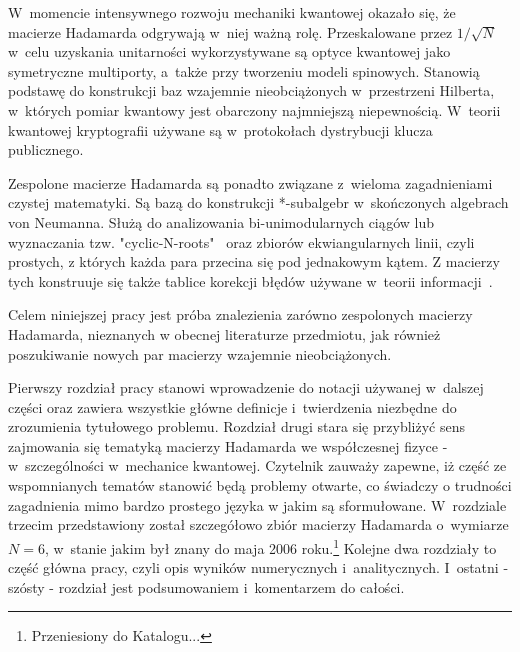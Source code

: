 \documentclass[a4paper,12pt,twoside]{article}
\begin{document}
W~momencie intensywnego rozwoju mechaniki kwantowej okaza{\l}o si\k{e}, \.{z}e macierze Hadamarda odgrywaj\k{a} w~niej wa\.{z}n\k{a} rol\k{e}. Przeskalowane przez $1/\sqrt{N}$ w~celu uzyskania unitarno\'{s}ci wykorzystywane s\k{a} optyce kwantowej jako symetryczne multiporty, a~tak\.{z}e przy tworzeniu modeli spinowych. Stanowi\k{a} podstaw\k{e} do konstrukcji baz wzajemnie nie\-ob\-ci\k{a}\-\.{z}o\-nych w~przestrzeni Hilberta, w~kt\'{o}rych pomiar kwantowy jest obarczony naj\-mniej\-sz\k{a} niepewno\'{s}ci\k{a}. W~teorii kwantowej kryptografii u\.{z}ywane s\k{a} w~protoko{\l}ach dystrybucji klucza publicznego.

Zespolone macierze Hadamarda s\k{a} ponadto zwi\k{a}zane z~wieloma zagadnieniami czystej matematyki. S\k{a} baz\k{a} do konstrukcji *-subalgebr w~sko\'{n}czonych algebrach von Neumanna. S{\l}u\.{z}\k{a} do analizowania bi-unimodularnych ci\k{a}g\'{o}w lub wyznaczania tzw. "cyclic-N-roots"~\cite{BF91, Ha96} oraz zbior\'{o}w ekwiangularnych linii, czyli prostych, z kt\'{o}rych ka\.{z}da para przecina si\k{e} pod jednakowym k\k{a}tem. Z macierzy tych konstruuje si\k{e} tak\.{z}e tablice korekcji b{\l}\k{e}d\'{o}w u\.{z}ywane w~teorii informacji~\cite{HC98, Kn96}.

Celem niniejszej pracy jest pr\'{o}ba znalezienia zar\'{o}wno zespolonych macierzy Ha\-da\-mar\-da, nieznanych w obecnej literaturze przedmiotu, jak r\'{o}wnie\.{z} poszukiwanie nowych par macierzy wzajemnie nieobci\k{a}\.{z}onych.

Pierwszy rozdzia{\l} pracy stanowi wprowadzenie do notacji u\.{z}ywanej w~dalszej cz\k{e}\'{s}ci oraz zawiera wszystkie g{\l}\'{o}wne definicje i~twierdzenia niezb\k{e}dne do zrozumienia tytu{\l}owego problemu. Rozdzia{\l} drugi stara si\k{e} przybli\.{z}y\'{c} sens zajmowania si\k{e} tematyk\k{a} macierzy Hadamarda we wsp\'{o}{\l}czesnej fizyce - w~szczeg\'{o}lno\'{s}ci w~mechanice kwantowej. Czytelnik zauwa\.{z}y zapewne, i\.{z} cz\k{e}\'{s}\'{c} ze wspomnianych temat\'{o}w stanowi\'{c} b\k{e}d\k{a} problemy otwarte, co \'{s}wiadczy o trudno\'{s}ci zagadnienia mimo bardzo prostego j\k{e}zyka w jakim s\k{a} sformu{\l}owane. W~rozdziale trzecim przedstawiony zosta{\l} szczeg\'{o}{\l}owo zbi\'{o}r macierzy Hadamarda o~wy\-mia\-rze $N=6$, w~stanie jakim by{\l} znany do maja 2006 roku.\footnote{Przeniesiony do Katalogu...} Kolejne dwa rozdzia{\l}y to cz\k{e}\'{s}\'{c} g{\l}\'{o}wna pracy, czyli opis wynik\'{o}w numerycznych i~analitycznych. I~ostatni - sz\'{o}sty - rozdzia{\l} jest podsumowaniem i~komentarzem do ca{\l}o\'{s}ci.
\end{document}
